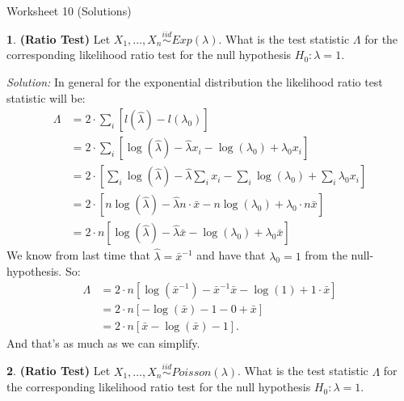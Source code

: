 \documentclass{tufte-handout}
\newcommand{\iid}{\stackrel{iid}{\sim}}
\begin{document}
\justify

{\LARGE Worksheet 10 (Solutions)}

\vspace*{18pt}


\textbf{1}. \textbf{(Ratio Test)} Let $X_1, \ldots, X_n \iid Exp(\lambda)$.
What is the test statistic $\Lambda$ for the corresponding likelihood 
ratio test for the null hypothesis $H_0: \lambda = 1$.

\textit{Solution:} In general for the exponential distribution the likelihood ratio test statistic
will be:
\begin{align*}
\Lambda &= 2 \cdot \sum_i \left[ l(\hat{\lambda}) - l(\lambda_0)  \right] \\
&= 2 \cdot \sum_i \left[ \log(\hat{\lambda}) - \hat{\lambda} x_i - \log(\lambda_0) + \lambda_0 x_i  \right] \\
&= 2 \cdot \left[ \sum_i \log(\hat{\lambda}) - \hat{\lambda} \sum_i x_i - \sum_i \log(\lambda_0) + \sum_i \lambda_0 x_i  \right] \\
&= 2 \cdot \left[ n \log(\hat{\lambda}) - \hat{\lambda} n \cdot \bar{x} - n \log(\lambda_0) + \lambda_0 \cdot n \bar{x} \right] \\
&= 2 \cdot n \left[ \log(\hat{\lambda}) - \hat{\lambda} \bar{x} - \log(\lambda_0) + \lambda_0 \bar{x} \right]
\end{align*}
We know from last time that $\hat{\lambda} = \bar{x}^{-1}$ and have that $\lambda_0 = 1$
from the null-hypothesis. So:
\begin{align*}
\Lambda &= 2 \cdot n \left[ \log(\bar{x}^{-1}) - \bar{x}^{-1} \bar{x} - \log(1) + 1 \cdot \bar{x} \right] \\
&= 2 \cdot n \left[ - \log(\bar{x}) - 1 - 0 + \bar{x} \right] \\
&= 2 \cdot n \left[ \bar{x} - \log(\bar{x}) - 1  \right].
\end{align*}
And that's as much as we can simplify.

\textbf{2}. \textbf{(Ratio Test)} Let $X_1, \ldots, X_n \iid Poisson(\lambda)$.
What is the test statistic $\Lambda$ for the corresponding likelihood 
ratio test for the null hypothesis $H_0: \lambda = 1$.
\end{document}
